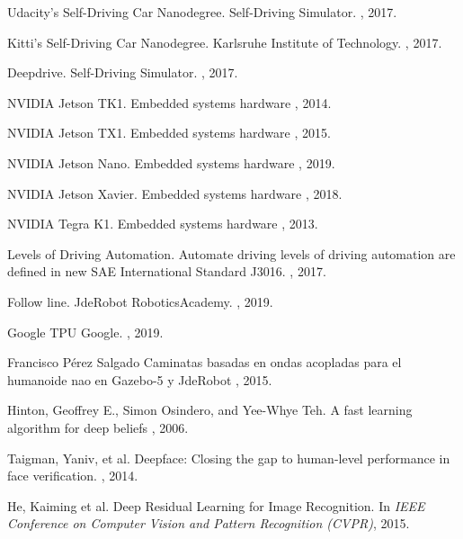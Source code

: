 \begin{thebibliography}{1}
 Udacity's Self-Driving Car Nanodegree.
\newblock Self-Driving Simulator.
, 2017.

Kitti's Self-Driving Car Nanodegree.
\newblock Karlsruhe Institute of Technology.
, 2017.


Deepdrive.
\newblock Self-Driving Simulator.
, 2017.

NVIDIA Jetson TK1.
\newblock Embedded systems hardware
, 2014.

NVIDIA Jetson TX1.
\newblock Embedded systems hardware
, 2015.

NVIDIA Jetson Nano.
\newblock Embedded systems hardware
, 2019.

NVIDIA Jetson Xavier.
\newblock Embedded systems hardware
, 2018.

NVIDIA Tegra K1.
\newblock Embedded systems hardware
, 2013.

Levels of Driving Automation.
\newblock Automate driving levels of driving automation are defined in new SAE International Standard J3016.
, 2017.

Follow line.
\newblock JdeRobot RoboticsAcademy.
, 2019.

Google TPU
\newblock Google.
, 2019.

Francisco Pérez Salgado
\newblock Caminatas basadas en ondas acopladas para el humanoide nao en Gazebo-5 y JdeRobot
, 2015.

Hinton, Geoffrey E., Simon Osindero, and Yee-Whye Teh.
\newblock A fast learning algorithm for deep beliefs
, 2006.

Taigman, Yaniv, et al.
\newblock Deepface: Closing the gap to human-level performance in face verification.
, 2014.

He, Kaiming et al.
\newblock Deep Residual Learning for Image Recognition.
\newblock In {\em IEEE Conference on Computer Vision and Pattern Recognition (CVPR)}, 2015.



\end{thebibliography}
